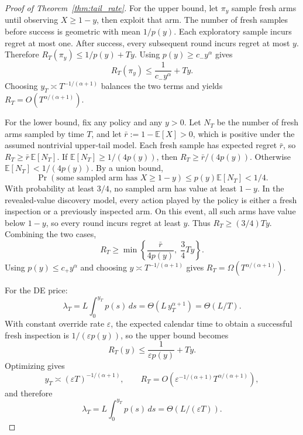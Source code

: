 \documentclass[10pt,a4paper]{amsart}
\newcommand{\E}{\mathbb{E}}
\begin{document}
\begin{proof}[Proof of Theorem~\ref{thm:tail_rate}]
For the upper bound, let $\pi_y$ sample fresh arms until observing $X\ge 1-y$, then exploit that arm.
The number of fresh samples before success is geometric with mean $1/p(y)$.
Each exploratory sample incurs regret at most one.
After success, every subsequent round incurs regret at most $y$.
Therefore $R_T(\pi_y)\le 1/p(y)+Ty$.
Using $p(y)\ge c_-y^\alpha$ gives
\[
  R_T(\pi_y)
  \le
  \frac{1}{c_-y^\alpha}+Ty.
\]
Choosing $y_T\asymp T^{-1/(\alpha+1)}$ balances the two terms and yields $R_T=O(T^{\alpha/(\alpha+1)})$.

For the lower bound, fix any policy and any $y>0$.
Let $N_T$ be the number of fresh arms sampled by time $T$, and let $\bar{r}:=1-\E[X]>0$, which is positive under the assumed nontrivial upper-tail model.
Each fresh sample has expected regret $\bar{r}$, so $R_T\ge \bar{r}\,\E[N_T]$.
If $\E[N_T]\ge 1/(4p(y))$, then $R_T\ge \bar{r}/(4p(y))$.
Otherwise $\E[N_T]<1/(4p(y))$.
By a union bound,
\[
  \Pr(\text{some sampled arm has }X\ge 1-y)
  \le p(y)\E[N_T] < 1/4.
\]
With probability at least $3/4$, no sampled arm has value at least $1-y$.
In the revealed-value discovery model, every action played by the policy is either a fresh inspection or a previously inspected arm.
On this event, all such arms have value below $1-y$, so every round incurs regret at least $y$.
Thus $R_T\ge (3/4)Ty$.
Combining the two cases,
\[
  R_T
  \ge
  \min\left\{
    \frac{\bar{r}}{4p(y)},\;
    \frac{3}{4}Ty
  \right\}.
\]
Using $p(y)\le c_+y^\alpha$ and choosing $y\asymp T^{-1/(\alpha+1)}$ gives $R_T=\Omega(T^{\alpha/(\alpha+1)})$.

For the DE price:
\[
  \lambda_T
  =
  L\int_0^{y_T}p(s)\,ds
  =
  \Theta(L\,y_T^{\alpha+1})
  =
  \Theta(L/T).
\]
With constant override rate $\varepsilon$, the expected calendar time to obtain a successful fresh inspection is $1/(\varepsilon p(y))$, so the upper bound becomes
\[
  R_T(y)\le \frac{1}{\varepsilon p(y)}+Ty.
\]
Optimizing gives
\[
  y_T\asymp(\varepsilon T)^{-1/(\alpha+1)},
  \qquad
  R_T=O\!\left(\varepsilon^{-1/(\alpha+1)}T^{\alpha/(\alpha+1)}\right),
\]
and therefore
\[
  \lambda_T
  =
  L\int_0^{y_T}p(s)\,ds
  =
  \Theta(L/(\varepsilon T)).
\]

\end{proof}
\end{document}
